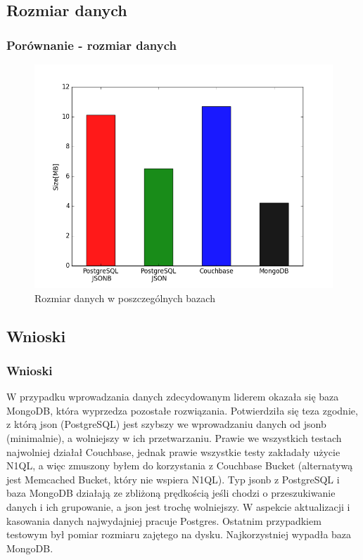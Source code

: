 \documentclass{beamer}
\begin{document}
\begin{frame}[fragile]
\subsection{Rozmiar danych}
\frametitle{Porównanie - rozmiar danych}

\begin{figure}[h]
\begin{center}
\includegraphics[scale=0.37]{ax/fig7}
\end{center}
\caption{Rozmiar danych w poszczególnych bazach}
\end{figure}

\end{frame}

\subsection{Wnioski}
\begin{frame}
\frametitle{Wnioski}
W przypadku wprowadzania danych zdecydowanym liderem okazała się baza MongoDB, która wyprzedza pozostałe rozwiązania. Potwierdziła się teza zgodnie, z którą json (PostgreSQL) jest szybszy we wprowadzaniu danych od jsonb (minimalnie), a wolniejszy w ich przetwarzaniu. Prawie we wszystkich testach najwolniej działał Couchbase, jednak prawie wszystkie testy zakładały użycie N1QL, a więc zmuszony byłem do korzystania z Couchbase Bucket (alternatywą jest Memcached Bucket, który nie wspiera N1QL). Typ jsonb z PostgreSQL i baza MongoDB działają ze zbliżoną prędkością jeśli chodzi o przeszukiwanie danych i ich grupowanie, a json jest trochę wolniejszy. W aspekcie aktualizacji i kasowania danych najwydajniej pracuje Postgres. Ostatnim przypadkiem testowym był pomiar rozmiaru zajętego na dysku. Najkorzystniej wypadła baza MongoDB.
\end{frame}
\end{document}
